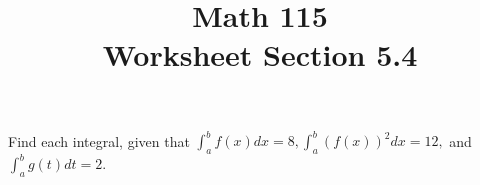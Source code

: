 \documentclass[11pt]{exam}
\title{\vspace{-0.5in} Math 115 \\ Worksheet Section 5.4}
\date{}
\begin{document}
\maketitle
\vspace{-0.75in}
\begin{questions}
  \question Find each integral, given that $\int_a^b f(x) dx = 8, \int_a^b (f(x))^2 dx = 12,$ and $\int_a^b g(t) dt= 2.$  
\end{questions}
\end{document}
